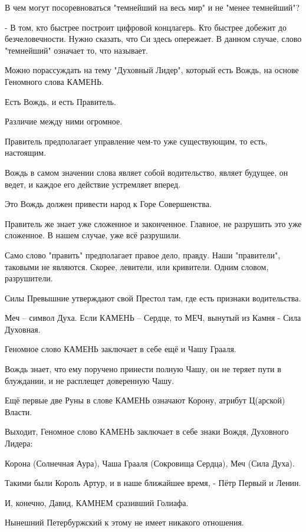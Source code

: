 \begin{itemize}
В чем могут посоревноваться "темнейший на весь мир" и не "менее темнейший"?

- В том, кто быстрее построит цифровой концлагерь. Кто быстрее добежит до
безчеловечности. Нужно сказать, что Си здесь опережает. В данном случае, слово
"темнейший" означает то, что называет.

Можно порассуждать на тему "Духовный Лидер", который есть Вождь, на основе
Геномного слова КАМЕНЬ.

Есть Вождь, и есть Правитель.

Различие между ними огромное.

Правитель предполагает управление чем-то уже существующим, то есть, настоящим.

Вождь в самом значении слова являет собой водительство, являет будущее, он
ведет, и каждое его действие устремляет вперед.

Это Вождь должен привести народ к Горе Совершенства.

Правитель же знает уже сложенное и законченное. Главное, не разрушить это уже
сложенное. В нашем случае, уже всё разрушили.

Само слово "править" предполагает правое дело, правду. Наши "правители",
таковыми не являются. Скорее, левители, или кривители. Одним словом,
разрушители.

Силы Превышние утверждают свой Престол там, где есть признаки водительства.

Меч – символ Духа. Если КАМЕНЬ – Сердце, то МЕЧ, вынутый из Камня - Сила
Духовная.

Геномное слово КАМЕНЬ заключает в себе ещё и Чашу Грааля.

Вождь знает, что ему поручено принести полную Чашу, он не теряет пути в
блуждании, и не расплещет доверенную Чашу.

Ещё первые две Руны в слове КАМЕНЬ означают Корону, атрибут Ц(арской) Власти.

Выходит, Геномное слово КАМЕНЬ заключает в себе знаки Вождя, Духовного Лидера:

Корона (Солнечная Аура), Чаша Грааля (Сокровища Сердца), Меч (Сила Духа).

Такими были Король Артур, и в наше ближайшее время, - Пётр Первый и Ленин.

И, конечно, Давид, КАМНЕМ сразивший Голиафа.

Нынешний Петербуржский к этому не имеет никакого отношения.

\begin{itemize}
 

\end{itemize}
\end{itemize}
